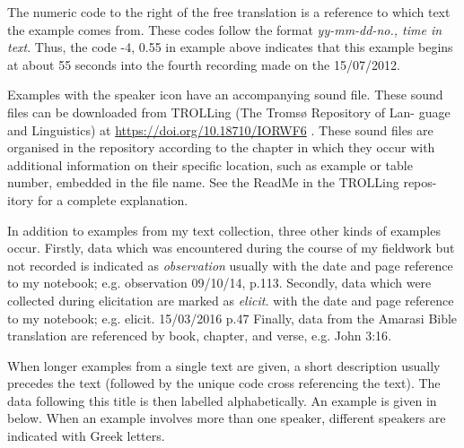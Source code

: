 The numeric code to the right of the free translation
is a reference to which text the example comes from.
These codes follow the format \emph{yy-mm-dd-no., time in text}.
Thus, the code {-4, 0.55} in example  above
indicates that this example begins at about 55 seconds
into the fourth recording made on the 15/07/2012.

Examples with the speaker icon \spk{}
have an accompanying sound file.
These
sound files can be downloaded from TROLLing (The Tromsø Repository of Lan-
guage and Linguistics) at \url{https://doi.org/10.18710/IORWF6}  \citep{ed20}. These
sound files are organised in the repository according to the chapter in which they
occur with additional information on their specific location, such as example or
table number, embedded in the file name. See the ReadMe in the TROLLing repos-
itory for a complete explanation.


In addition to examples from my text collection,
three other kinds of examples occur.
Firstly, data which was encountered during the course
of my fieldwork but not recorded is indicated as \emph{observation}
usually with the date and page reference to my notebook; e.g. {\ttfamily observation 09/10/14, p.113}.
Secondly, data which were collected during elicitation are marked as \emph{elicit.}
with the date and page reference to my notebook; e.g. {\ttfamily elicit. 15/03/2016 p.47}
Finally, data from the Amarasi Bible translation are referenced
by book, chapter, and verse, e.g. {\ttfamily John 3:16}.

When longer examples from a single text are given,
a short description usually precedes the text
(followed by the unique code cross referencing the text).
The data following this title is then labelled alphabetically.
An example is given in  below.
When an example involves more than one speaker,
different speakers are indicated with Greek letters.

\largerpage
\begin{exe}
	\label{ex:120715-4, 0.43-0.45 ch:Intr}
	\begin{xlist}
		\label{ex:120715-4, 0.43 ch:Intr}
\clearpage
		\label{ex:120715-4, 0.45 ch:Intr}
	\end{xlist}
\end{exe}


